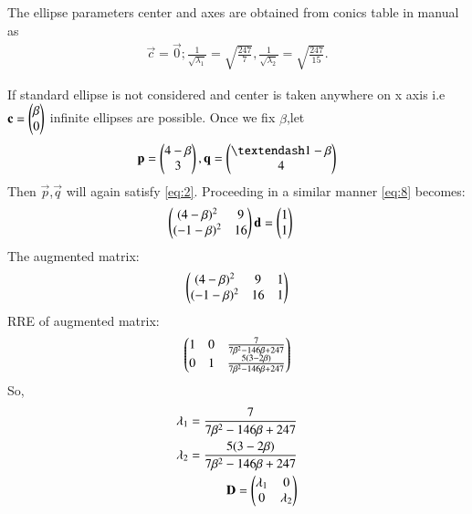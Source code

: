 \documentclass[journal,12pt,twocolumn]{IEEEtran}
\begin{document}
The ellipse parameters center and axes are obtained from conics table in manual as
\begin{align}
\vec{c} = \vec{0};
\frac{1}{\sqrt{\lambda_1}}  = \sqrt{\frac{247}{7}},
\frac{1}{\sqrt{\lambda_2}}  = \sqrt{\frac{247}{15}}.
\end{align}

If standard ellipse is not considered and center is taken anywhere on x axis i.e
$\mathbf{c}=\begin{pmatrix}\beta\\0\end{pmatrix}$ infinite ellipses are possible.
Once we fix $\beta$,let
\begin{align}
\vec{p} = \myvec{4-\beta\\3} , \vec{q} = \myvec{– 1-\beta\\4}
\end{align}
Then $\vec{p}$,$\vec{q}$ will again satisfy \eqref{eq:2}.
Proceeding in a similar manner \eqref{eq:8} becomes:
\begin{align}
\begin{pmatrix}(4-\beta)^2 & 9\\ (-1-\beta)^2 & 16\end{pmatrix}\mathbf{d} &= \begin{pmatrix}1\\1\end{pmatrix}
\end{align}
The augmented matrix:
\begin{align}
    \begin{pmatrix}(4-\beta)^2 & 9&1\\ (-1-\beta)^2 & 16&1\end{pmatrix}
\end{align}
RRE of augmented matrix:
\begin{align}
    \begin{pmatrix}1&0&\frac{7}{7\beta^2-146\beta+247}\\0&1&\frac{5(3-2\beta)}{7\beta^2-146\beta+247}\end{pmatrix}
\end{align}
So,
\begin{align}
    \lambda_1=\frac{7}{7\beta^2-146\beta+247}\label{eq:18}\\
    \lambda_2=\frac{5(3-2\beta)}{7\beta^2-146\beta+247}\label{eq:19}\\
    \mathbf{D}=\begin{pmatrix}\lambda_1&0\\0&\lambda_2\end{pmatrix}
\end{align}
\end{document}
